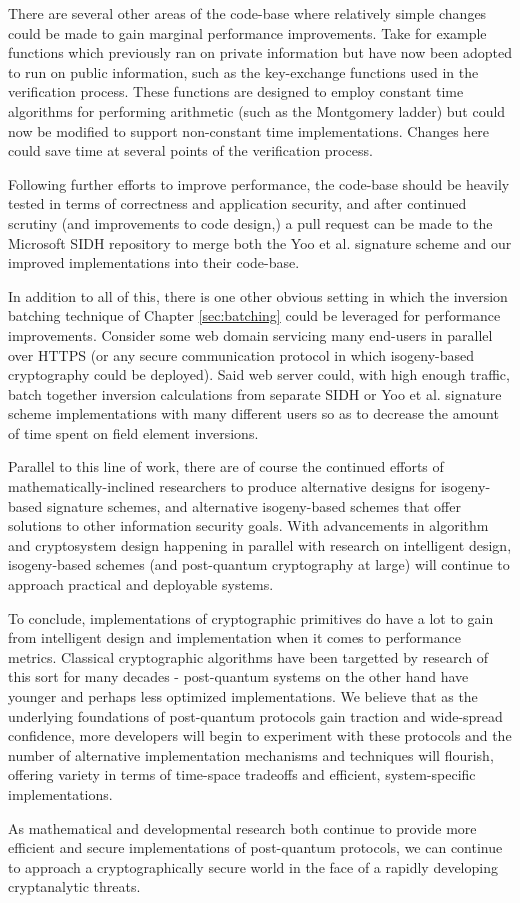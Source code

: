 There are several other areas of the code-base where relatively simple changes could be made to gain marginal performance improvements. Take for example functions which previously ran on private information but have now been adopted to run on public information, such as the key-exchange functions used in the verification process. These functions are designed to employ constant time algorithms for performing arithmetic (such as the Montgomery ladder) but could now be modified to support non-constant time implementations. Changes here could save time at several points of the verification process.

Following further efforts to improve performance, the code-base should be heavily tested in terms of correctness and application security, and after continued scrutiny (and improvements to code design,) a pull request can be made to the Microsoft SIDH repository \cite{sidhcode} to merge both the Yoo et al. signature scheme and our improved implementations into their code-base.

In addition to all of this, there is one other obvious setting in which the inversion batching technique of Chapter \ref{sec:batching} could be leveraged for performance improvements. Consider some web domain servicing many end-users in parallel over HTTPS (or any secure communication protocol in which isogeny-based cryptography could be deployed). Said web server could, with high enough traffic, batch together inversion calculations from separate SIDH or Yoo et al. signature scheme implementations with many different users so as to decrease the amount of time spent on field element inversions.

Parallel to this line of work, there are of course the continued efforts of mathematically-inclined researchers to produce alternative designs for isogeny-based signature schemes, and alternative isogeny-based schemes that offer solutions to other information security goals. With advancements in algorithm and cryptosystem design happening in parallel with research on intelligent design, isogeny-based schemes (and post-quantum cryptography at large) will continue to approach practical and deployable systems.


\vspace{50px}

To conclude, implementations of cryptographic primitives do have a lot to gain from intelligent design and implementation when it comes to performance metrics. Classical cryptographic algorithms have been targetted by research of this sort for many decades - post-quantum systems on the other hand have younger and perhaps less optimized implementations. We believe that as the underlying foundations of post-quantum protocols gain traction and wide-spread confidence, more developers will begin to experiment with these protocols and the number of alternative implementation mechanisms and techniques will flourish, offering variety in terms of time-space tradeoffs and efficient, system-specific implementations.

As mathematical and developmental research both continue to provide more efficient and secure implementations of post-quantum protocols, we can continue to approach a cryptographically secure world in the face of a rapidly developing cryptanalytic threats.
